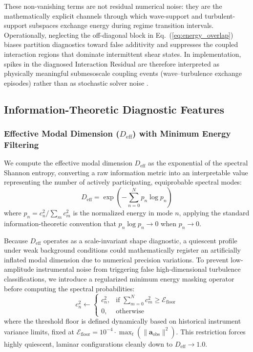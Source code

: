 \documentclass[11pt,a4paper]{article}
\begin{document}
These non-vanishing terms are not residual numerical noise: they are the mathematically explicit channels through which wave-support and turbulent-support subspaces exchange energy during regime transition intervals. Operationally, neglecting the off-diagonal block in Eq.~(\ref{eq:energy_overlap}) biases partition diagnostics toward false additivity and suppresses the coupled interaction regions that dominate intermittent shear states.
In implementation, spikes in the diagnosed Interaction Residual are therefore interpreted as physically meaningful submesoscale coupling events (wave--turbulence exchange episodes) rather than as stochastic solver noise \citep{Sun2015, Mahrt2010}.


\subsection{Information-Theoretic Diagnostic Features}
\label{sec:methods:diagnostics}

\subsubsection{Effective Modal Dimension (\texorpdfstring{$D_{\mathrm{eff}}$}{Deff}) with Minimum Energy Filtering}

We compute the effective modal dimension $D_{\mathrm{eff}}$ as the exponential of the spectral Shannon entropy, converting a raw information metric into an interpretable value representing the number of actively participating, equiprobable spectral modes:
\begin{equation}
D_{\mathrm{eff}} = \exp\left( -\sum_{n=0}^{N} p_n \log p_n \right)
\label{eq:d_eff_def}
\end{equation}
where $p_n = c_n^2 / \sum_m c_m^2$ is the normalized energy in mode $n$, applying the standard information-theoretic convention that $p_n \log p_n \to 0$ when $p_n \to 0$.

Because $D_{\mathrm{eff}}$ operates as a scale-invariant shape diagnostic, a quiescent profile under weak background conditions could mathematically register an artificially inflated modal dimension due to numerical precision variations. To prevent low-amplitude instrumental noise from triggering false high-dimensional turbulence classifications, we introduce a regularized minimum energy masking operator before computing the spectral probabilities:
\begin{equation}
c_n^2 \leftarrow \begin{cases}
c_n^2, & \text{if } \sum_{m=0}^{N} c_m^2 \ge \mathcal{E}_{\text{floor}} \\
0, & \text{otherwise}
\end{cases}
\label{eq:energy_floor}
\end{equation}
where the threshold floor is defined dynamically based on historical instrument variance limits, fixed at $\mathcal{E}_{\text{floor}} = 10^{-4} \cdot \max_{t} \left(\|\mathbf{a}_{\mathrm{obs}}\|^2\right)$. This restriction forces highly quiescent, laminar configurations cleanly down to $D_{\mathrm{eff}} \to 1.0$.
\end{document}
